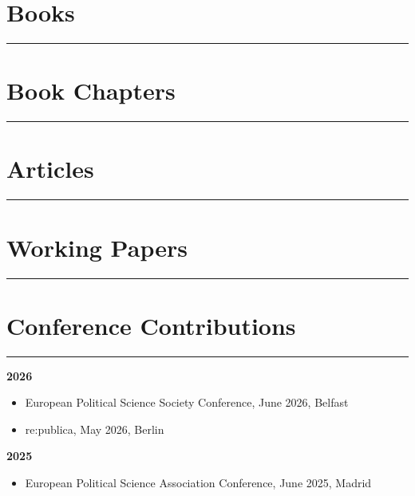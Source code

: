 \section*{Books}\vspace{-2em}\rule{\textwidth}{0.5pt}
\printbibliography[
	type=book,
	heading=none
]

\section*{Book Chapters}\vspace{-2em}\rule{\textwidth}{0.5pt}
\printbibliography[
	type=incollection,
	heading=none
]

\section*{Articles}\vspace{-2em}\rule{\textwidth}{0.5pt}
\printbibliography[
	type=article,
	heading=none
]

\section*{Working Papers}\vspace{-2em}\rule{\textwidth}{0.5pt}
\printbibliography[
	type=misc,
	heading=none
]


\section*{Conference Contributions}\vspace{-2em}\rule{\textwidth}{0.5pt}\vspace{1em}


\textbf{2026}
\begin{itemize}[topsep=0pt, noitemsep, leftmargin=3]
    \item European Political Science Society Conference, June 2026, Belfast
    \item re:publica, May 2026, Berlin
\end{itemize}



\vspace{\baselineskip}


\textbf{2025}
\begin{itemize}[topsep=0pt, noitemsep, leftmargin=3]
	\item European Political Science Association Conference, June 2025, Madrid
\end{itemize}



